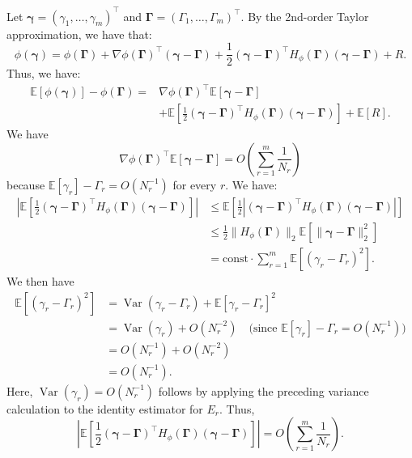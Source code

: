 \documentclass{article}
\begin{document}
Let $\boldsymbol{\gamma}=(\gamma_1,\ldots,\gamma_m)^\top$ and
$\boldsymbol{\Gamma}=(\Gamma_1,\ldots,\Gamma_m)^\top$. By the 2nd-order
Taylor approximation, we have that:
\[
\phi(\boldsymbol{\gamma})
=\phi(\boldsymbol{\Gamma})
+\nabla\phi(\boldsymbol{\Gamma})^\top
(\boldsymbol{\gamma}-\boldsymbol{\Gamma})
+\frac{1}{2}(\boldsymbol{\gamma}-\boldsymbol{\Gamma})^\top
H_\phi(\boldsymbol{\Gamma})
(\boldsymbol{\gamma}-\boldsymbol{\Gamma})+R.
\]
Thus, we have:
\begin{align*}
\mathbb{E}[\phi(\boldsymbol{\gamma})]-\phi(\boldsymbol{\Gamma})
={}&\nabla\phi(\boldsymbol{\Gamma})^\top
\mathbb{E}[\boldsymbol{\gamma}-\boldsymbol{\Gamma}]\\
&+\mathbb{E}\!\left[\frac{1}{2}
(\boldsymbol{\gamma}-\boldsymbol{\Gamma})^\top
H_\phi(\boldsymbol{\Gamma})
(\boldsymbol{\gamma}-\boldsymbol{\Gamma})\right]
+\mathbb{E}[R].
\end{align*}
We have
\[
\nabla\phi(\boldsymbol{\Gamma})^\top
\mathbb{E}[\boldsymbol{\gamma}-\boldsymbol{\Gamma}]
=O\!\left(\sum_{r=1}^m\frac{1}{N_r}\right)
\]
because $\mathbb{E}[\gamma_r]-\Gamma_r=O(N_r^{-1})$ for every $r$. We have:
\begin{align*}
\left|\mathbb{E}\!\left[\frac{1}{2}
(\boldsymbol{\gamma}-\boldsymbol{\Gamma})^\top
H_\phi(\boldsymbol{\Gamma})
(\boldsymbol{\gamma}-\boldsymbol{\Gamma})\right]\right|
&\leq \mathbb{E}\!\left[\frac{1}{2}
\left|(\boldsymbol{\gamma}-\boldsymbol{\Gamma})^\top
H_\phi(\boldsymbol{\Gamma})
(\boldsymbol{\gamma}-\boldsymbol{\Gamma})\right|\right]\\
&\leq \frac{1}{2}\lVert H_\phi(\boldsymbol{\Gamma})\rVert_2
\mathbb{E}\!\left[\lVert
\boldsymbol{\gamma}-\boldsymbol{\Gamma}\rVert_2^2\right]\\
&=\mathrm{const}\cdot\sum_{r=1}^m
\mathbb{E}[(\gamma_r-\Gamma_r)^2].
\end{align*}
We then have
\begin{align*}
\mathbb{E}[(\gamma_r-\Gamma_r)^2]
&=\operatorname{Var}(\gamma_r-\Gamma_r)
+\mathbb{E}[\gamma_r-\Gamma_r]^2\\
&=\operatorname{Var}(\gamma_r)+O(N_r^{-2})
\quad\text{(since $\mathbb{E}[\gamma_r]-\Gamma_r=O(N_r^{-1})$)}\\
&=O(N_r^{-1})+O(N_r^{-2})\\
&=O(N_r^{-1}).
\end{align*}
Here, $\operatorname{Var}(\gamma_r)=O(N_r^{-1})$ follows by applying the
preceding variance calculation to the identity estimator for $E_r$.
Thus,
\[
\left|\mathbb{E}\!\left[\frac{1}{2}
(\boldsymbol{\gamma}-\boldsymbol{\Gamma})^\top
H_\phi(\boldsymbol{\Gamma})
(\boldsymbol{\gamma}-\boldsymbol{\Gamma})\right]\right|
=O\!\left(\sum_{r=1}^m\frac{1}{N_r}\right).
\]
\end{document}
